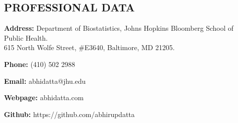 \documentclass[12pt]{article}
\begin{document}
%
%
%
%
\subsection*{PROFESSIONAL DATA}

\textbf{Address:} Department of Biostatistics, Johns Hopkins Bloomberg School of Public Health.\\[0.2em]
615 North Wolfe Street, \#E3640, Baltimore, MD 21205.

\textbf{Phone:} (410) 502 2988  

\textbf{Email:} abhidatta@jhu.edu 

\textbf{Webpage:} abhidatta.com 

\textbf{Github:} https://github.com/abhirupdatta
\end{document}

